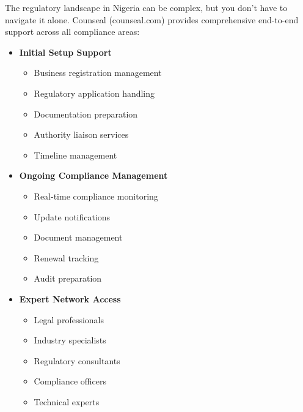 \begin{tcolorbox}[
    colback=white,
    colframe=primarydark,
    title=\textbf{Counseal Support Framework},
    before skip=1em,
    after skip=1em
]
    The regulatory landscape in Nigeria can be complex, but you don't have to navigate it alone. Counseal (counseal.com) provides comprehensive end-to-end support across all compliance areas:

    \begin{itemize}[leftmargin=*,itemsep=0.5em]
        \item \textbf{Initial Setup Support}
        \begin{itemize}[itemsep=0.3em]
            \item Business registration management
            \item Regulatory application handling
            \item Documentation preparation
            \item Authority liaison services
            \item Timeline management
        \end{itemize}

        \vspace{0.5em}

        \item \textbf{Ongoing Compliance Management}
        \begin{itemize}[itemsep=0.3em]
            \item Real-time compliance monitoring
            \item Update notifications
            \item Document management
            \item Renewal tracking
            \item Audit preparation
        \end{itemize}

        \vspace{0.5em}

        \item \textbf{Expert Network Access}
        \begin{itemize}[itemsep=0.3em]
            \item Legal professionals
            \item Industry specialists
            \item Regulatory consultants
            \item Compliance officers
            \item Technical experts
        \end{itemize}


\end{itemize}
\end{tcolorbox}
